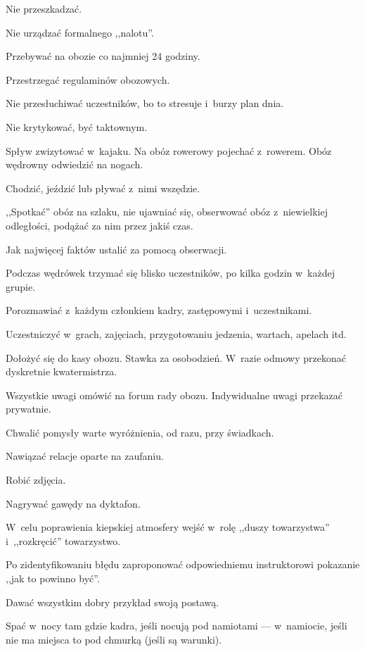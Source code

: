 \documentclass[a4paper,10pt,notitlepage,twoside]{article}
\newcommand*{\thecheckbox}{\hss$\Box$} %
\newenvironment*{checklist}
{\list{}{%
\renewcommand*{\makelabel}[1]{\thecheckbox}}}
{\endlist}
\begin{document}
\begin{checklist}
\item Nie przeszkadzać.
\item Nie urządzać formalnego ,,nalotu''.
\item Przebywać na obozie co najmniej 24 godziny.
\item Przestrzegać regulaminów obozowych.
\item Nie przesłuchiwać uczestników, bo to stresuje i~burzy plan dnia.
\item Nie krytykować, być taktownym.
\item Spływ zwizytować w~kajaku. Na obóz rowerowy pojechać z~rowerem. Obóz wędrowny odwiedzić na nogach.
\item Chodzić, jeździć lub pływać z~nimi wszędzie.
\item ,,Spotkać'' obóz na szlaku, nie ujawniać się, obserwować obóz z~niewielkiej odległości, podążać za nim przez jakiś czas.
\item Jak najwięcej faktów ustalić za pomocą obserwacji.
\item Podczas wędrówek trzymać się blisko uczestników, po kilka godzin w~każdej grupie.
\item Porozmawiać z~każdym członkiem kadry, zastępowymi i~uczestnikami.
\item Uczestniczyć w~grach, zajęciach, przygotowaniu jedzenia, wartach, apelach itd.
\item Dołożyć się do kasy obozu. Stawka za osobodzień. W~razie odmowy przekonać dyskretnie kwatermistrza.
\item Wszystkie uwagi omówić na forum rady obozu. Indywidualne uwagi przekazać prywatnie.
\item Chwalić pomysły warte wyróżnienia, od razu, przy świadkach.
\item Nawiązać relacje oparte na zaufaniu.
\item Robić zdjęcia.
\item Nagrywać gawędy na dyktafon.
\item W~celu poprawienia kiepskiej atmosfery wejść w~rolę ,,duszy towarzystwa'' i~,,rozkręcić'' towarzystwo.
\item Po zidentyfikowaniu błędu zaproponować odpowiedniemu instruktorowi pokazanie ,,jak to powinno być''.
\item Dawać wszystkim dobry przykład swoją postawą.
\item Spać w~nocy tam gdzie kadra, jeśli nocują pod namiotami --- w~namiocie, jeśli nie ma miejsca to pod chmurką (jeśli są warunki).
\end{checklist}
\end{document}
